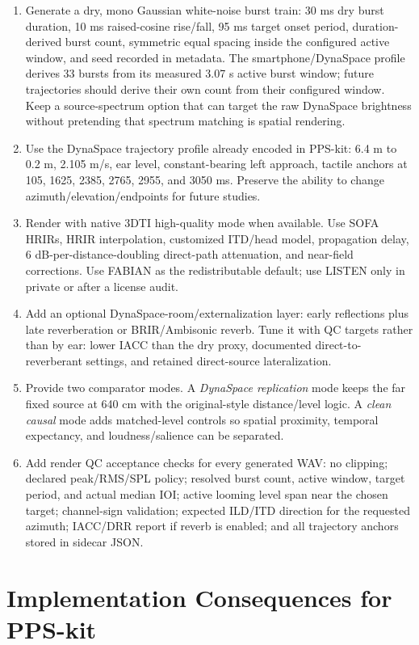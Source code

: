 \documentclass[10pt]{article}
\begin{document}
\begin{enumerate}
  \item Generate a dry, mono Gaussian white-noise burst train: 30 ms dry burst duration, 10 ms raised-cosine rise/fall, 95 ms target onset period, duration-derived burst count, symmetric equal spacing inside the configured active window, and seed recorded in metadata. The smartphone/DynaSpace profile derives 33 bursts from its measured 3.07 s active burst window; future trajectories should derive their own count from their configured window. Keep a source-spectrum option that can target the raw DynaSpace brightness without pretending that spectrum matching is spatial rendering.
  \item Use the DynaSpace trajectory profile already encoded in PPS-kit: 6.4 m to 0.2 m, 2.105 m/s, ear level, constant-bearing left approach, tactile anchors at 105, 1625, 2385, 2765, 2955, and 3050 ms. Preserve the ability to change azimuth/elevation/endpoints for future studies.
  \item Render with native 3DTI high-quality mode when available. Use SOFA HRIRs, HRIR interpolation, customized ITD/head model, propagation delay, 6 dB-per-distance-doubling direct-path attenuation, and near-field corrections. Use FABIAN as the redistributable default; use LISTEN only in private or after a license audit.
  \item Add an optional DynaSpace-room/externalization layer: early reflections plus late reverberation or BRIR/Ambisonic reverb. Tune it with QC targets rather than by ear: lower IACC than the dry proxy, documented direct-to-reverberant settings, and retained direct-source lateralization.
  \item Provide two comparator modes. A \textit{DynaSpace replication} mode keeps the far fixed source at 640 cm with the original-style distance/level logic. A \textit{clean causal} mode adds matched-level controls so spatial proximity, temporal expectancy, and loudness/salience can be separated.
  \item Add render QC acceptance checks for every generated WAV: no clipping; declared peak/RMS/SPL policy; resolved burst count, active window, target period, and actual median IOI; active looming level span near the chosen target; channel-sign validation; expected ILD/ITD direction for the requested azimuth; IACC/DRR report if reverb is enabled; and all trajectory anchors stored in sidecar JSON.
\end{enumerate}

\section*{Implementation Consequences for PPS-kit}
\end{document}
